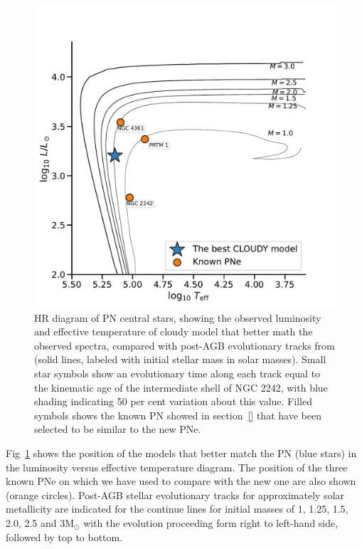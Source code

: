 \documentclass[fleqn,usenatbib]{mnras}
\begin{document}
\begin{figure}
\centering
  \includegraphics[width=\linewidth]{Figs/hr-planetarieNebula}
  \caption{HR diagram of PN central stars, showing the observed luminosity
    and effective temperature of {\sc cloudy} model that better math the observed spectra,
    compared with post-AGB evolutionary tracks from \citet{Miller:2016} (solid lines, labeled
    with initial stellar mass in solar masses). Small star symbols show
an evolutionary time along each track equal to the kinematic age of the
intermediate shell of NGC 2242, with blue shading indicating 50 per cent
variation about this value. Filled symbols shows the known PN showed in section~\ref{}
that have been selected to be similar to the new PNe. } 
 \label{fig:track-evolutive}
\end{figure}

Fig~\ref{fig:track-evolutive} shows the position of the models that better match the PN
(blue stars) in the luminosity versus effective temperature diagram.
The position of the three known PNe on which we have used to compare with the new
one are also shown (orange circles). Post-AGB stellar evolutionary tracks
for approximately solar metallicity \citep{Miller:2016} are indicated for the continue
lines for initial masses of 1, 1.25, 1.5, 2.0, 2.5 and 3M$_{\odot}$ with
the evolution proceeding form right to left-hand side, followed by top to bottom.
\end{document}
